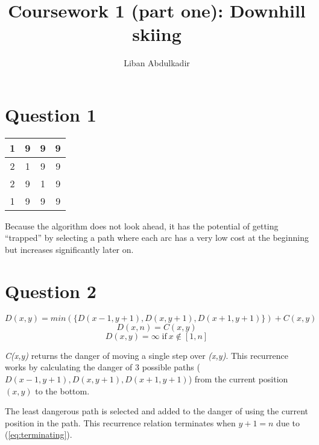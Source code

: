 \documentclass{article}
\begin{document}
\title{Coursework 1 (part one): Downhill skiing}
\author{\Large Liban Abdulkadir \\ \normalsize}

\maketitle

\section*{Question 1}
\begin{center}
    \begin{tabular}{| c | c | c | c | }
    \hline
    1 & 9 & 9 & 9 \\ \hline
    2 & 1 & 9 & 9 \\ \hline
    2 & 9 & 1 & 9 \\ \hline
    1 & 9 & 9 & 9 \\ \hline
    \end{tabular}
\end{center}
Because the algorithm does not look ahead, it has the potential of getting “trapped” by selecting a path where each arc has a very low cost at the beginning but increases significantly later on.
\section*{Question 2}
\begin{equation}D(x,y) = min(\{D(x-1,y+1),D(x,y+1),D(x+1,y+1)\}) + C(x,y)\end{equation}
\begin{equation}D(x,n) = C(x,y)\label{eq:terminating}\end{equation}
\begin{equation}D(x,y) = \infty\;\text{if}\: x \notin [1,n]\end{equation}

\emph{C(x,y)} returns the danger of moving a single step over \emph{(x,y)}.
This recurrence works by calculating the danger of 3 possible paths 
(\begin{math}D(x-1,y+1), D(x,y+1), D(x+1,y+1)\end{math}) from the current position 
\begin{math}(x,y)\end{math} to the bottom.

The least dangerous path is selected and added to the danger of using the current position in the path.
This recurrence relation terminates when \begin{math}y+1 = n\end{math} due to (\ref{eq:terminating}).
\end{document}
